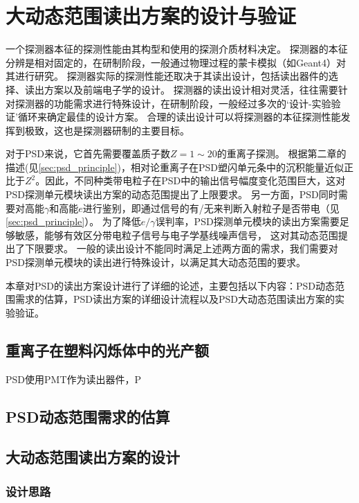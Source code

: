 \chapter{大动态范围读出方案的设计与验证}
\label{ch:large_dynmaicrange}
一个探测器本征的探测性能由其构型和使用的探测介质材料决定。
探测器的本征分辨是相对固定的，在研制阶段，一般通过物理过程的蒙卡模拟（如Geant4）对其进行研究。
探测器实际的探测性能还取决于其读出设计，包括读出器件的选择、读出方案以及前端电子学的设计。
探测器的读出设计相对灵活，往往需要针对探测器的功能需求进行特殊设计，在研制阶段，一般经过多次的‘设计-实验验证’循环来确定最佳的设计方案。
合理的读出设计可以将探测器的本征探测性能发挥到极致，这也是探测器研制的主要目标。

对于PSD来说，它首先需要覆盖质子数$Z=1 \sim 20$的重离子探测。
根据第二章的描述(见\ref{sec:psd_principle})，相对论重离子在PSD塑闪单元条中的沉积能量近似正比于$Z^2$。因此，不同种类带电粒子在PSD中的输出信号幅度变化范围巨大，这对PSD探测单元模块读出方案的动态范围提出了上限要求。
另一方面，PSD同时需要对高能$\gamma$和高能$e$进行鉴别，即通过信号的有/无来判断入射粒子是否带电（见\ref{sec:psd_principle}）。
为了降低$e/\gamma$误判率，PSD探测单元模块的读出方案需要足够敏感，能够有效区分带电粒子信号与电子学基线噪声信号，
这对其动态范围提出了下限要求。
一般的读出设计不能同时满足上述两方面的需求，我们需要对PSD探测单元模块的读出进行特殊设计，以满足其大动态范围的要求。

本章对PSD的读出方案设计进行了详细的论述，主要包括以下内容：PSD动态范围需求的估算，PSD读出方案的详细设计流程以及PSD大动态范围读出方案的实验验证。


\section{重离子在塑料闪烁体中的光产额}
\label{sec:dynamic_range:light_yield}
PSD使用PMT作为读出器件，P

\section{PSD动态范围需求的估算}
\label{sec:dynamic_range:estimation}

\section{大动态范围读出方案的设计}
\label{sec:dynamic_range:design}

\subsection{设计思路}
\label{sec:dynamic_range:readout_scheme}

